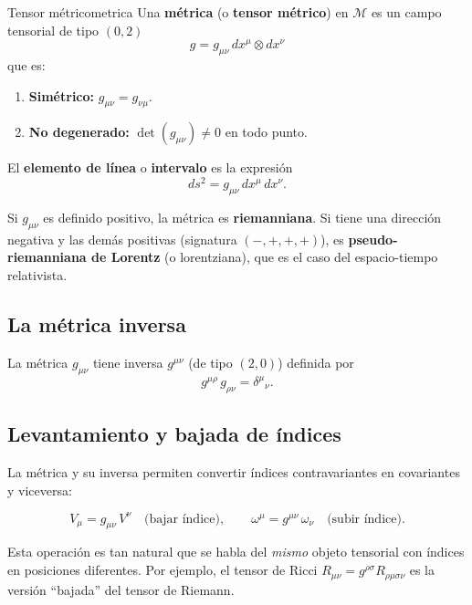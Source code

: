 \begin{definicion}{Tensor métrico}{metrica}
Una \textbf{métrica} (o \textbf{tensor métrico}) en $\mathcal{M}$ es un campo tensorial de tipo $(0,2)$
\[
  g = g_{\mu\nu}\, dx^\mu \otimes dx^\nu
\]
que es:
\begin{enumerate}[leftmargin=2em]
  \item \textbf{Simétrico:} $g_{\mu\nu} = g_{\nu\mu}$.
  \item \textbf{No degenerado:} $\det(g_{\mu\nu}) \neq 0$ en todo punto.
\end{enumerate}
El \textbf{elemento de línea} o \textbf{intervalo} es la expresión
\begin{equation}
  ds^2 = g_{\mu\nu}\, dx^\mu\, dx^\nu.
  \label{eq:elemento_linea}
\end{equation}
\end{definicion}

Si $g_{\mu\nu}$ es definido positivo, la métrica es \textbf{riemanniana}. Si tiene una dirección negativa y las demás positivas (signatura $(-,+,+,+)$), es \textbf{pseudo-riemanniana de Lorentz} (o lorentziana), que es el caso del espacio-tiempo relativista.

\subsection{La métrica inversa}

La métrica $g_{\mu\nu}$ tiene inversa $g^{\mu\nu}$ (de tipo $(2,0)$) definida por
\begin{equation}
  g^{\mu\rho}\, g_{\rho\nu} = \delta^\mu{}_\nu.
  \label{eq:metrica_inv}
\end{equation}

\subsection{Levantamiento y bajada de índices}

La métrica y su inversa permiten convertir índices contravariantes en covariantes y viceversa:

\begin{equation}
  V_\mu = g_{\mu\nu}\, V^\nu \quad \text{(bajar índice)}, \qquad
  \omega^\mu = g^{\mu\nu}\, \omega_\nu \quad \text{(subir índice)}.
  \label{eq:raise_lower}
\end{equation}

Esta operación es tan natural que se habla del \emph{mismo} objeto tensorial con índices en posiciones diferentes. Por ejemplo, el tensor de Ricci $R_{\mu\nu} = g^{\rho\sigma} R_{\rho\mu\sigma\nu}$ es la versión ``bajada'' del tensor de Riemann.

